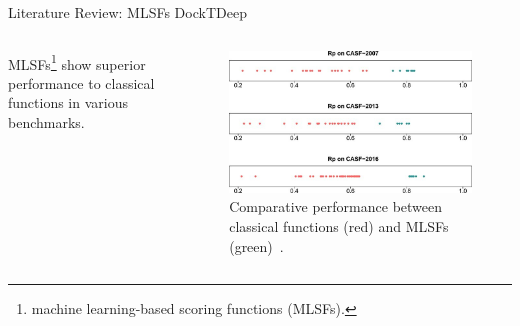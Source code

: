 \documentclass[aspectratio=169,xcolor=dvipsnames]{beamer}
\begin{document}
\begin{frame}{Literature Review: MLSFs \hfill {\footnotesize \alert{DockTDeep}}}
    \begin{columns}
        MLSFs\footnote{machine learning-based scoring functions (MLSFs).} show \alert{superior performance} to classical functions in various benchmarks.

        \begin{figure}
            \centering
            \includegraphics[width=1.\linewidth]{imgs/performance-classical-vs-mlsf.jpg}
            \caption{Comparative performance between classical functions (red) and MLSFs (green)~\cite{li2021machine}.}
        \end{figure}
    \end{columns}
\end{frame}
\end{document}
